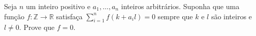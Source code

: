 Seja \( n\) um inteiro positivo e \( a_{1}, \ldots, a_{n}\) inteiros arbitrários. Suponha que uma função \( f\colon  \mathbb{Z}\to \mathbb{R}\) satisfaça \( \sum_{i=1}^{n}f(k+a_{i}l) = 0\) sempre que \( k\) e \( l\) são inteiros e \( l \ne 0\). Prove que \( f = 0\).
